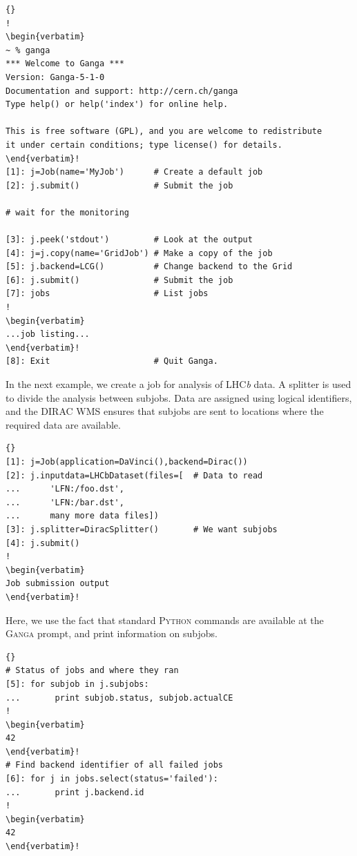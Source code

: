\documentclass{elsart}
\def\lhcb {LHC{\em b\/}\xspace}
\def\dirac{DIRAC\xspace}
\def\ganga {\textsc{Ganga}\xspace}
\def\python {\textsc{Python}\xspace}
\begin{document}
\tiny
\lstset{language=Python} \lstset{commentstyle=\textit}
\lstset{backgroundcolor=,rulecolor=}
\begin{lstlisting}[escapechar=!]{}
!
\begin{verbatim}
~ % ganga
*** Welcome to Ganga ***
Version: Ganga-5-1-0
Documentation and support: http://cern.ch/ganga
Type help() or help('index') for online help.

This is free software (GPL), and you are welcome to redistribute
it under certain conditions; type license() for details.
\end{verbatim}!
[1]: j=Job(name='MyJob')      # Create a default job
[2]: j.submit()               # Submit the job

# wait for the monitoring

[3]: j.peek('stdout')         # Look at the output
[4]: j=j.copy(name='GridJob') # Make a copy of the job
[5]: j.backend=LCG()          # Change backend to the Grid
[6]: j.submit()               # Submit the job
[7]: jobs                     # List jobs
!
\begin{verbatim}
...job listing...
\end{verbatim}!
[8]: Exit                     # Quit Ganga.
\end{lstlisting}
\normalsize

\vspace{-2ex}
In the next example, we create a job for analysis of \lhcb
data. A splitter is used to divide the analysis between subjobs.
Data are assigned using logical identifiers, and the \dirac WMS ensures
that subjobs are sent to locations where the required data are available.
\tiny
\begin{lstlisting}[escapechar=!]{}
[1]: j=Job(application=DaVinci(),backend=Dirac())
[2]: j.inputdata=LHCbDataset(files=[  # Data to read
...      'LFN:/foo.dst',
...      'LFN:/bar.dst',
...      many more data files])
[3]: j.splitter=DiracSplitter()       # We want subjobs
[4]: j.submit()
!
\begin{verbatim}
Job submission output
\end{verbatim}!
\end{lstlisting}
\normalsize

\vspace{-2ex}
Here, we use the fact that standard \python commands are available at the
\ganga prompt, and print information on subjobs.
\tiny
\begin{lstlisting}[escapechar=!]{}
# Status of jobs and where they ran
[5]: for subjob in j.subjobs: 
...       print subjob.status, subjob.actualCE
!
\begin{verbatim}
42
\end{verbatim}!
# Find backend identifier of all failed jobs
[6]: for j in jobs.select(status='failed'):
...       print j.backend.id
!
\begin{verbatim}
42
\end{verbatim}!
\end{lstlisting}
\normalsize
\end{document}
